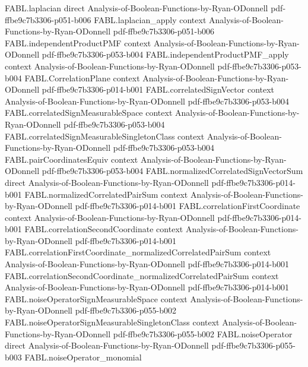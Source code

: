 \begin{theorem}
\proofstep
  {FABL.laplacian}
  {direct}
  {Analysis-of-Boolean-Functions-by-Ryan-ODonnell}
  {pdf-ffbe9c7b3306-p051-b006}
\proofstep
  {FABL.laplacian_apply}
  {context}
  {Analysis-of-Boolean-Functions-by-Ryan-ODonnell}
  {pdf-ffbe9c7b3306-p051-b006}
\proofstep
  {FABL.independentProductPMF}
  {context}
  {Analysis-of-Boolean-Functions-by-Ryan-ODonnell}
  {pdf-ffbe9c7b3306-p053-b004}
\proofstep
  {FABL.independentProductPMF_apply}
  {context}
  {Analysis-of-Boolean-Functions-by-Ryan-ODonnell}
  {pdf-ffbe9c7b3306-p053-b004}
\proofstep
  {FABL.CorrelationPlane}
  {context}
  {Analysis-of-Boolean-Functions-by-Ryan-ODonnell}
  {pdf-ffbe9c7b3306-p014-b001}
\proofstep
  {FABL.correlatedSignVector}
  {context}
  {Analysis-of-Boolean-Functions-by-Ryan-ODonnell}
  {pdf-ffbe9c7b3306-p053-b004}
\proofstep
  {FABL.correlatedSignMeasurableSpace}
  {context}
  {Analysis-of-Boolean-Functions-by-Ryan-ODonnell}
  {pdf-ffbe9c7b3306-p053-b004}
\proofstep
  {FABL.correlatedSignMeasurableSingletonClass}
  {context}
  {Analysis-of-Boolean-Functions-by-Ryan-ODonnell}
  {pdf-ffbe9c7b3306-p053-b004}
\proofstep
  {FABL.pairCoordinatesEquiv}
  {context}
  {Analysis-of-Boolean-Functions-by-Ryan-ODonnell}
  {pdf-ffbe9c7b3306-p053-b004}
\proofstep
  {FABL.normalizedCorrelatedSignVectorSum}
  {direct}
  {Analysis-of-Boolean-Functions-by-Ryan-ODonnell}
  {pdf-ffbe9c7b3306-p014-b001}
\proofstep
  {FABL.normalizedCorrelatedPairSum}
  {context}
  {Analysis-of-Boolean-Functions-by-Ryan-ODonnell}
  {pdf-ffbe9c7b3306-p014-b001}
\proofstep
  {FABL.correlationFirstCoordinate}
  {context}
  {Analysis-of-Boolean-Functions-by-Ryan-ODonnell}
  {pdf-ffbe9c7b3306-p014-b001}
\proofstep
  {FABL.correlationSecondCoordinate}
  {context}
  {Analysis-of-Boolean-Functions-by-Ryan-ODonnell}
  {pdf-ffbe9c7b3306-p014-b001}
\proofstep
  {FABL.correlationFirstCoordinate_normalizedCorrelatedPairSum}
  {context}
  {Analysis-of-Boolean-Functions-by-Ryan-ODonnell}
  {pdf-ffbe9c7b3306-p014-b001}
\proofstep
  {FABL.correlationSecondCoordinate_normalizedCorrelatedPairSum}
  {context}
  {Analysis-of-Boolean-Functions-by-Ryan-ODonnell}
  {pdf-ffbe9c7b3306-p014-b001}
\proofstep
  {FABL.noiseOperatorSignMeasurableSpace}
  {context}
  {Analysis-of-Boolean-Functions-by-Ryan-ODonnell}
  {pdf-ffbe9c7b3306-p055-b002}
\proofstep
  {FABL.noiseOperatorSignMeasurableSingletonClass}
  {context}
  {Analysis-of-Boolean-Functions-by-Ryan-ODonnell}
  {pdf-ffbe9c7b3306-p055-b002}
\proofstep
  {FABL.noiseOperator}
  {direct}
  {Analysis-of-Boolean-Functions-by-Ryan-ODonnell}
  {pdf-ffbe9c7b3306-p055-b003}
\proofstep
  {FABL.noiseOperator_monomial}

\end{theorem}
